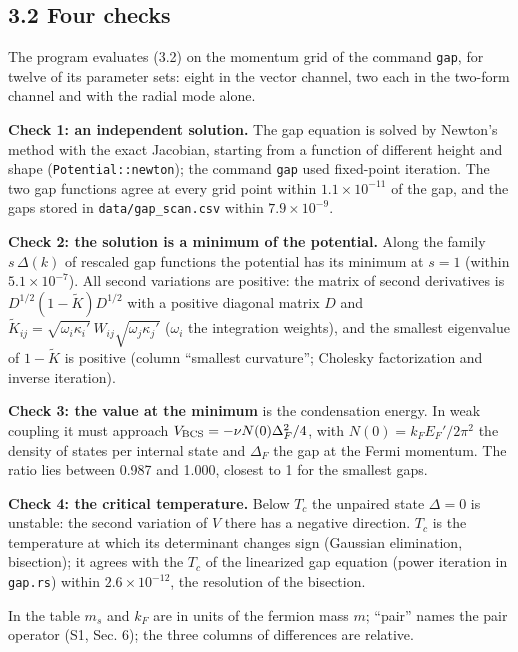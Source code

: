 \documentclass[
  10pt,
]{article}
\begin{document}
\hypertarget{four-checks}{%
\subsection{3.2 Four checks}\label{four-checks}}

The program evaluates (3.2) on the momentum grid of the command
\texttt{gap}, for twelve of its parameter sets: eight in the vector
channel, two each in the two-form channel and with the radial mode
alone.

\textbf{Check 1: an independent solution.} The gap equation is solved by
Newton's method with the exact Jacobian, starting from a function of
different height and shape (\texttt{Potential::newton}); the command
\texttt{gap} used fixed-point iteration. The two gap functions agree at
every grid point within \(1.1\times10^{-11}\) of the gap, and the gaps
stored in \texttt{data/gap\_scan.csv} within \(7.9\times10^{-9}\).

\textbf{Check 2: the solution is a minimum of the potential.} Along the
family \(s\,\Delta(k)\) of rescaled gap functions the potential has its
minimum at \(s=1\) (within \(5.1\times10^{-7}\)). All second variations
are positive: the matrix of second derivatives is
\(D^{1/2}(1-\tilde K)D^{1/2}\) with a positive diagonal matrix \(D\) and
\(\tilde K_{ij}=\sqrt{\omega_i\kappa_i'}\,W_{ij}\sqrt{\omega_j\kappa_j'}\)
(\(\omega_i\) the integration weights), and the smallest eigenvalue of
\(1-\tilde K\) is positive (column ``smallest curvature''; Cholesky
factorization and inverse iteration).

\textbf{Check 3: the value at the minimum} is the condensation energy.
In weak coupling it must approach \(V_{\rm BCS}=-\nu N(0)\Delta_F^2/4\),
with \(N(0)=k_FE_F'/2\pi^2\) the density of states per internal state
and \(\Delta_F\) the gap at the Fermi momentum. The ratio lies between
0.987 and 1.000, closest to 1 for the smallest gaps.

\textbf{Check 4: the critical temperature.} Below \(T_c\) the unpaired
state \(\Delta=0\) is unstable: the second variation of \(V\) there has
a negative direction. \(T_c\) is the temperature at which its
determinant changes sign (Gaussian elimination, bisection); it agrees
with the \(T_c\) of the linearized gap equation (power iteration in
\texttt{gap.rs}) within \(2.6\times10^{-12}\), the resolution of the
bisection.

In the table \(m_s\) and \(k_F\) are in units of the fermion mass \(m\);
``pair'' names the pair operator (S1, Sec. 6); the three columns of
differences are relative.
\end{document}
